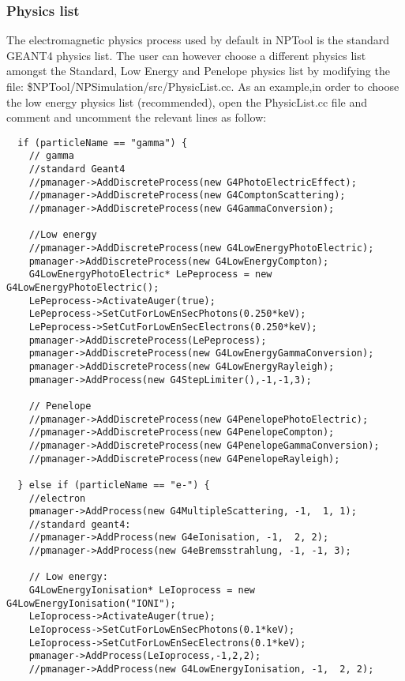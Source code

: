 \documentclass[a4paper,12pt]{article}
\begin{document}
\subsubsection{Physics list}

The electromagnetic physics process used by default in NPTool is the standard GEANT4 physics 
list. The user can  however choose a different physics list amongst the Standard, Low Energy 
and Penelope physics list by modifying the file: \$NPTool/NPSimulation/src/PhysicList.cc.
As an example,in order to choose the low energy physics list (recommended), open the 
PhysicList.cc file and comment and uncomment the relevant lines as follow:

\scriptsize
\begin{verbatim}
  if (particleName == "gamma") {
    // gamma
    //standard Geant4
    //pmanager->AddDiscreteProcess(new G4PhotoElectricEffect);
    //pmanager->AddDiscreteProcess(new G4ComptonScattering);
    //pmanager->AddDiscreteProcess(new G4GammaConversion);

    //Low energy
    //pmanager->AddDiscreteProcess(new G4LowEnergyPhotoElectric);
    pmanager->AddDiscreteProcess(new G4LowEnergyCompton);
    G4LowEnergyPhotoElectric* LePeprocess = new G4LowEnergyPhotoElectric();
    LePeprocess->ActivateAuger(true);
    LePeprocess->SetCutForLowEnSecPhotons(0.250*keV);
    LePeprocess->SetCutForLowEnSecElectrons(0.250*keV);
    pmanager->AddDiscreteProcess(LePeprocess);
    pmanager->AddDiscreteProcess(new G4LowEnergyGammaConversion);
    pmanager->AddDiscreteProcess(new G4LowEnergyRayleigh);
    pmanager->AddProcess(new G4StepLimiter(),-1,-1,3);

    // Penelope
    //pmanager->AddDiscreteProcess(new G4PenelopePhotoElectric);
    //pmanager->AddDiscreteProcess(new G4PenelopeCompton);
    //pmanager->AddDiscreteProcess(new G4PenelopeGammaConversion);
    //pmanager->AddDiscreteProcess(new G4PenelopeRayleigh);

  } else if (particleName == "e-") {
    //electron
    pmanager->AddProcess(new G4MultipleScattering, -1,  1, 1);
    //standard geant4:
    //pmanager->AddProcess(new G4eIonisation, -1,  2, 2);
    //pmanager->AddProcess(new G4eBremsstrahlung, -1, -1, 3);
    
    // Low energy:
    G4LowEnergyIonisation* LeIoprocess = new G4LowEnergyIonisation("IONI");
    LeIoprocess->ActivateAuger(true);
    LeIoprocess->SetCutForLowEnSecPhotons(0.1*keV);
    LeIoprocess->SetCutForLowEnSecElectrons(0.1*keV);
    pmanager->AddProcess(LeIoprocess,-1,2,2);
    //pmanager->AddProcess(new G4LowEnergyIonisation, -1,  2, 2);
    

\end{verbatim}
\end{document}
